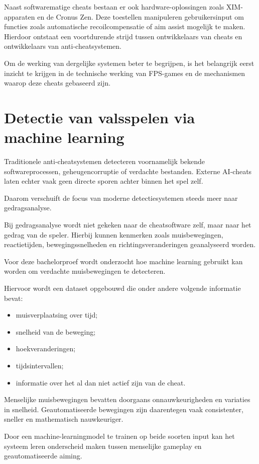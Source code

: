 Naast softwarematige cheats bestaan er ook hardware-oplossingen zoals XIM-apparaten en de Cronus Zen. Deze toestellen manipuleren gebruikersinput om functies zoals automatische recoilcompensatie of aim assist mogelijk te maken. Hierdoor ontstaat een voortdurende strijd tussen ontwikkelaars van cheats en ontwikkelaars van anti-cheatsystemen.

Om de werking van dergelijke systemen beter te begrijpen, is het belangrijk eerst inzicht te krijgen in de technische werking van FPS-games en de mechanismen waarop deze cheats gebaseerd zijn.


\section{Detectie van valsspelen via machine learning}

Traditionele anti-cheatsystemen detecteren voornamelijk bekende softwareprocessen, geheugencorruptie of verdachte bestanden. Externe AI-cheats laten echter vaak geen directe sporen achter binnen het spel zelf.

Daarom verschuift de focus van moderne detectiesystemen steeds meer naar gedragsanalyse.

Bij gedragsanalyse wordt niet gekeken naar de cheatsoftware zelf, maar naar het gedrag van de speler. Hierbij kunnen kenmerken zoals muisbewegingen, reactietijden, bewegingssnelheden en richtingsveranderingen geanalyseerd worden.

Voor deze bachelorproef wordt onderzocht hoe machine learning gebruikt kan worden om verdachte muisbewegingen te detecteren.

Hiervoor wordt een dataset opgebouwd die onder andere volgende informatie bevat:

\begin{itemize}
    \item muisverplaatsing over tijd;
    \item snelheid van de beweging;
    \item hoekveranderingen;
    \item tijdsintervallen;
    \item informatie over het al dan niet actief zijn van de cheat.
\end{itemize}

Menselijke muisbewegingen bevatten doorgaans onnauwkeurigheden en variaties in snelheid. Geautomatiseerde bewegingen zijn daarentegen vaak consistenter, sneller en mathematisch nauwkeuriger.

Door een machine-learningmodel te trainen op beide soorten input kan het systeem leren onderscheid maken tussen menselijke gameplay en geautomatiseerde aiming.

